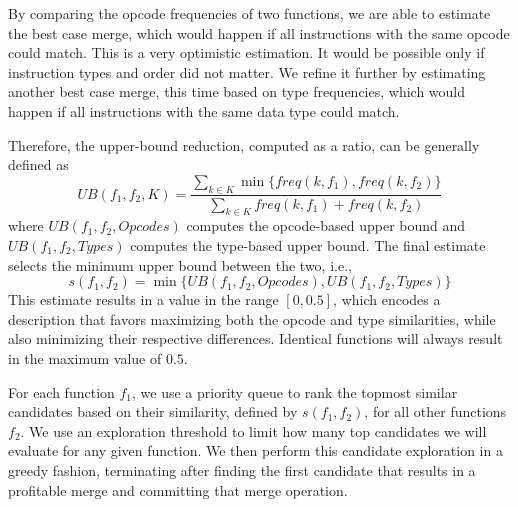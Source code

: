 By comparing the opcode frequencies of two functions, we are able to estimate
the best case merge, which would happen if all instructions with the same opcode could match.
This is a very optimistic estimation. It would be possible only if instruction types and order
did not matter. We refine it further by estimating another best case merge, this time based
on type frequencies, which would happen if all instructions with the same data type could match.


Therefore, the upper-bound reduction, computed as a ratio, can be generally defined as
\[
   U\!B(f_1,f_2, K) = \frac{\sum\limits_{k \in K} \min\{freq(k,f_1),freq(k,f_2)\}}{\sum\limits_{k \in K} freq(k,f_1)+freq(k,f_2)}
\]
where $U\!B(f_1,f_2, Opcodes)$ computes the opcode-based upper bound and
$U\!B(f_1,f_2, Types)$ computes the type-based upper bound.
The final estimate selects the minimum upper bound between the two, i.e.,
\[
     s(f_1,f_2) = \min\{U\!B(f_1,f_2, Opcodes), U\!B(f_1,f_2, Types)\}
\]
This estimate results in a value in the range $[0,0.5]$,
which encodes a description that favors maximizing both the opcode and type
similarities, while also minimizing their respective differences.
Identical functions will always result in the maximum value of $0.5$.

For each function $f_1$, we use a priority queue to rank the topmost
similar candidates based on their similarity, defined by $s(f_1,f_2)$, for all
other functions $f_2$.
We use an exploration threshold to limit how many top candidates we will
evaluate for any given function.
We then perform this candidate exploration in a greedy fashion, terminating after
finding the first candidate that results in a profitable merge and committing that
merge operation.


